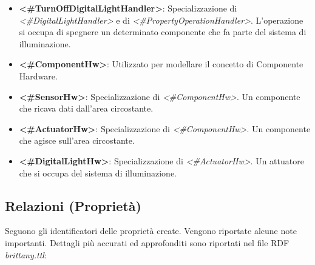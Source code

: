 \begin{itemize}
	\item \textbf{<\#TurnOffDigitalLightHandler>}: Specializzazione di \textit{<\#DigitalLightHandler>} e di \textit{<\#PropertyOperationHandler>}. L'operazione si occupa di spegnere un determinato componente che fa parte del sistema di illuminazione.
	\item \textbf{<\#ComponentHw>}: Utilizzato per modellare il concetto di Componente Hardware.
	\item \textbf{<\#SensorHw>}: Specializzazione di \textit{<\#ComponentHw>}. Un componente che ricava dati dall'area circostante.
	\item \textbf{<\#ActuatorHw>}: Specializzazione di \textit{<\#ComponentHw>}. Un componente che agisce sull'area circostante.
	\item \textbf{<\#DigitalLightHw>}: Specializzazione di \textit{<\#ActuatorHw>}. Un attuatore che si occupa del sistema di illuminazione.
\end{itemize}

\subsection{Relazioni (Proprietà)}
Seguono gli identificatori delle proprietà create. Vengono riportate alcune note importanti. Dettagli più accurati ed approfonditi sono riportati nel file RDF \textit{brittany.ttl}:

